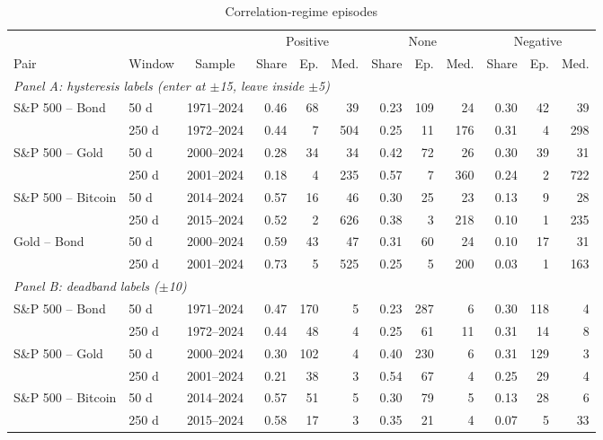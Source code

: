 \begin{table}[t]
\centering
\scriptsize
\setlength{\tabcolsep}{2.8pt}
\caption{Correlation-regime episodes}
\label{tab:regime_episodes}
\begin{tabular}{llcrrrrrrrrr}
\toprule
 & & & \multicolumn{3}{c}{Positive} & \multicolumn{3}{c}{None} & \multicolumn{3}{c}{Negative} \\
\cmidrule(lr){4-6}\cmidrule(lr){7-9}\cmidrule(lr){10-12}
Pair & Window & Sample & Share & Ep. & Med. & Share & Ep. & Med. & Share & Ep. & Med. \\
\midrule
\multicolumn{12}{l}{\textit{Panel A: hysteresis labels (enter at $\pm$15, leave inside $\pm$5)}} \\
\addlinespace[2pt]
S\&P 500 -- Bond & 50 d & 1971--2024 & 0.46 & 68 & 39 & 0.23 & 109 & 24 & 0.30 & 42 & 39 \\
 & 250 d & 1972--2024 & 0.44 & 7 & 504 & 0.25 & 11 & 176 & 0.31 & 4 & 298 \\
S\&P 500 -- Gold & 50 d & 2000--2024 & 0.28 & 34 & 34 & 0.42 & 72 & 26 & 0.30 & 39 & 31 \\
 & 250 d & 2001--2024 & 0.18 & 4 & 235 & 0.57 & 7 & 360 & 0.24 & 2 & 722 \\
S\&P 500 -- Bitcoin & 50 d & 2014--2024 & 0.57 & 16 & 46 & 0.30 & 25 & 23 & 0.13 & 9 & 28 \\
 & 250 d & 2015--2024 & 0.52 & 2 & 626 & 0.38 & 3 & 218 & 0.10 & 1 & 235 \\
Gold -- Bond & 50 d & 2000--2024 & 0.59 & 43 & 47 & 0.31 & 60 & 24 & 0.10 & 17 & 31 \\
 & 250 d & 2001--2024 & 0.73 & 5 & 525 & 0.25 & 5 & 200 & 0.03 & 1 & 163 \\
\midrule
\multicolumn{12}{l}{\textit{Panel B: deadband labels ($\pm$10)}} \\
\addlinespace[2pt]
S\&P 500 -- Bond & 50 d & 1971--2024 & 0.47 & 170 & 5 & 0.23 & 287 & 6 & 0.30 & 118 & 4 \\
 & 250 d & 1972--2024 & 0.44 & 48 & 4 & 0.25 & 61 & 11 & 0.31 & 14 & 8 \\
S\&P 500 -- Gold & 50 d & 2000--2024 & 0.30 & 102 & 4 & 0.40 & 230 & 6 & 0.31 & 129 & 3 \\
 & 250 d & 2001--2024 & 0.21 & 38 & 3 & 0.54 & 67 & 4 & 0.25 & 29 & 4 \\
S\&P 500 -- Bitcoin & 50 d & 2014--2024 & 0.57 & 51 & 5 & 0.30 & 79 & 5 & 0.13 & 28 & 6 \\
 & 250 d & 2015--2024 & 0.58 & 17 & 3 & 0.35 & 21 & 4 & 0.07 & 5 & 33 \\

\end{tabular}
\end{table}
